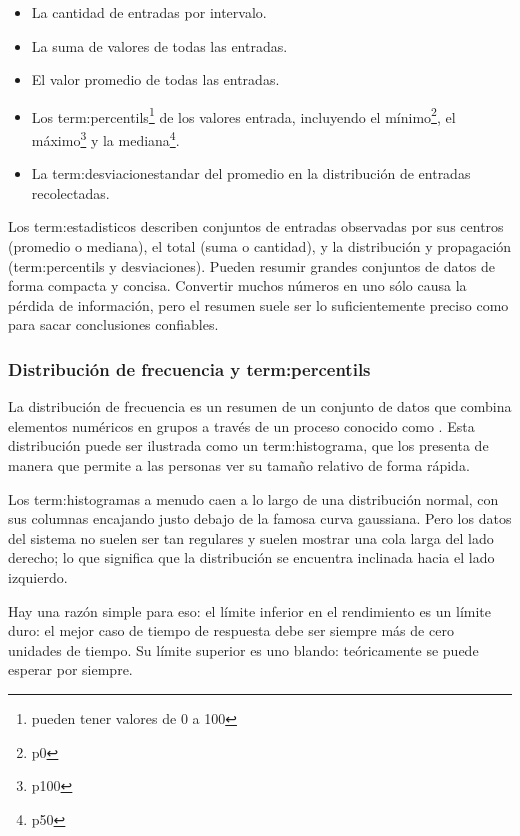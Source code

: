 \begin{itemize}
  \item La cantidad de entradas por intervalo.
  \item La suma de valores de todas las entradas.
  \item El valor promedio de todas las entradas.
  \item Los \glspl{term:percentil}\footnote{pueden tener valores de 0 a 100} de
    los valores entrada, incluyendo el mínimo\footnote{p0}, el
    máximo\footnote{p100} y la mediana\footnote{p50}.
  \item La \gls{term:desviacionestandar} del promedio en la distribución de
    entradas recolectadas.
\end{itemize}

Los \glspl{term:estadistico} describen conjuntos de entradas observadas por sus
centros (promedio o mediana), el total (suma o cantidad), y la distribución y
propagación (\glspl{term:percentil} y desviaciones). Pueden resumir grandes
conjuntos de datos de forma compacta y concisa. Convertir muchos números en uno
sólo causa la pérdida de información, pero el resumen suele ser lo
suficientemente preciso como para sacar conclusiones confiables.

\subsubsection*{Distribución de frecuencia y \glspl{term:percentil}}
\label{distribucion_de_frecuencia_y_percentiles}

La distribución de frecuencia es un resumen de un conjunto de datos que combina
elementos numéricos en grupos a través de un proceso conocido como
. Esta distribución puede ser ilustrada como un \gls{term:histograma}, que
los presenta de manera que permite a las personas ver su tamaño relativo de
forma rápida.

Los \glspl{term:histograma} a menudo caen a lo largo de una distribución
normal, con sus columnas encajando justo debajo de la famosa curva gaussiana.
Pero los datos del sistema no suelen ser tan regulares y suelen mostrar una
cola larga del lado derecho; lo que significa que la distribución se encuentra
inclinada hacia el lado izquierdo.

Hay una razón simple para eso: el límite inferior en el rendimiento es un
límite duro: el mejor caso de tiempo de respuesta debe ser siempre más de cero
unidades de tiempo. Su límite superior es uno blando: teóricamente se puede
esperar por siempre.

